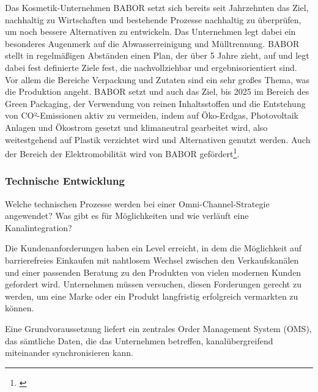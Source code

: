 Das Kosmetik-Unternehmen BABOR setzt sich bereits seit Jahrzehnten das Ziel, nachhaltig zu Wirtschaften und bestehende Prozesse nachhaltig zu überprüfen, um noch bessere Alternativen zu entwickeln. Das Unternehmen legt dabei ein besonderes Augenmerk auf die Abwasserreinigung und Mülltrennung. BABOR stellt in regelmäßigen Abständen einen Plan, der über 5 Jahre zieht, auf und legt dabei fest definierte Ziele fest, die nachvollziehbar und ergebnisorientiert sind. Vor allem die Bereiche Verpackung und Zutaten sind ein sehr großes Thema, was die Produktion angeht. BABOR setzt und auch das Ziel, bis 2025 im Bereich des Green Packaging, der Verwendung von reinen Inhaltsstoffen und die Entstehung von CO²-Emissionen aktiv zu vermeiden, indem auf Öko-Erdgas, Photovoltaik Anlagen und Ökostrom gesetzt und klimaneutral gearbeitet wird, also weitestgehend auf Plastik verzichtet wird und Alternativen genutzt werden.  Auch der Bereich der Elektromobilität wird von BABOR gefördert\footnote{\autocite [Online] {BABOR2022}}.

\subsubsection{Technische Entwicklung}\label{unterabschnitt_3_4_3}

Welche technischen Prozesse werden bei einer Omni-Channel-Strategie angewendet? Was gibt es für Möglichkeiten und wie verläuft eine Kanalintegration?
\newline

Die Kundenanforderungen haben ein Level erreicht, in dem die Möglichkeit auf barrierefreies Einkaufen mit nahtlosem Wechsel zwischen den Verkaufskanälen und einer passenden Beratung zu den Produkten von vielen modernen Kunden gefordert wird. Unternehmen müssen versuchen, diesen Forderungen gerecht zu werden, um eine Marke oder ein Produkt langfristig erfolgreich vermarkten zu können.
\newline

Eine Grundvoraussetzung liefert ein zentrales Order Management System (OMS), das sämtliche Daten, die das Unternehmen betreffen, kanalübergreifend miteinander synchronisieren kann.

